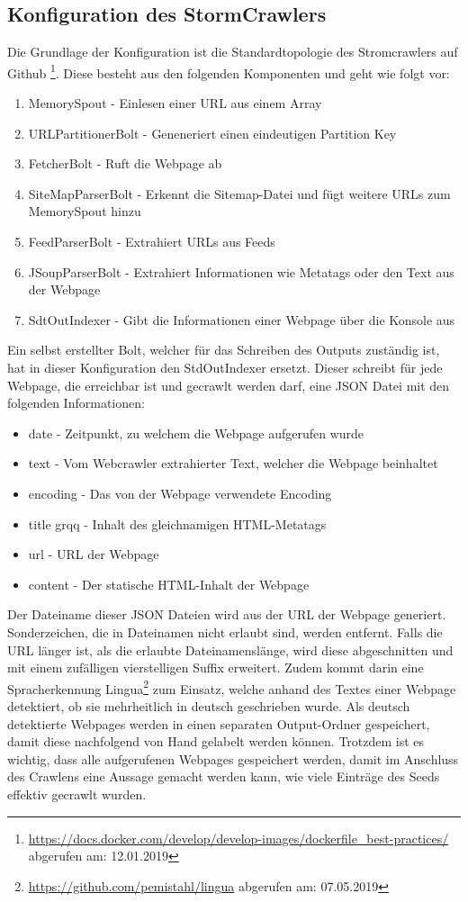 \subsection{Konfiguration des StormCrawlers}
Die Grundlage der Konfiguration ist die Standardtopologie des Stromcrawlers auf Github
\footnote{\url{https://docs.docker.com/develop/develop-images/dockerfile_best-practices/} abgerufen am: 12.01.2019}.
Diese besteht aus den folgenden Komponenten und geht wie folgt vor:
\begin{enumerate}
	\item MemorySpout - Einlesen einer URL aus einem Array
	\item URLPartitionerBolt - Geneneriert einen eindeutigen Partition Key
	\item FetcherBolt - Ruft die Webpage ab
	\item SiteMapParserBolt - Erkennt die Sitemap-Datei und fügt weitere URLs zum MemorySpout hinzu
	\item FeedParserBolt - Extrahiert URLs aus Feeds
	\item JSoupParserBolt - Extrahiert Informationen wie Metatags oder den Text aus der Webpage
	\item SdtOutIndexer - Gibt die Informationen einer Webpage über die Konsole aus
\end{enumerate}
Ein selbst erstellter Bolt, welcher für das Schreiben des Outputs zuständig ist, hat in dieser Konfiguration den StdOutIndexer ersetzt.
Dieser schreibt für jede Webpage, die erreichbar ist und gecrawlt werden darf, eine JSON Datei mit den folgenden Informationen:
\begin{itemize}
	\item \glqq date\grqq{} - Zeitpunkt, zu welchem die Webpage aufgerufen wurde
	\item \glqq text\grqq{} - Vom Webcrawler extrahierter Text, welcher die Webpage beinhaltet
	\item \glqq encoding\grqq{} - Das von der Webpage verwendete Encoding
	\item \glqq title grqq{} - Inhalt des gleichnamigen HTML-Metatags
	\item \glqq url\grqq{} - URL der Webpage
	\item \glqq content\grqq{} - Der statische HTML-Inhalt der Webpage	
\end{itemize}
Der Dateiname dieser JSON Dateien wird aus der URL der Webpage generiert. 
Sonderzeichen, die in Dateinamen nicht erlaubt sind, werden entfernt. Falls die URL länger ist, als die erlaubte Dateinamenslänge, wird diese abgeschnitten und mit einem zufälligen vierstelligen Suffix erweitert.
Zudem kommt darin eine Spracherkennung \glqq Lingua\footnote{\url{https://github.com/pemistahl/lingua} abgerufen am: 07.05.2019}\grqq{} zum Einsatz, welche anhand des Textes einer Webpage detektiert, ob sie mehrheitlich in deutsch geschrieben wurde.
Als deutsch detektierte Webpages werden in einen separaten Output-Ordner gespeichert, damit diese nachfolgend von Hand gelabelt werden können.
Trotzdem ist es wichtig, dass alle aufgerufenen Webpages gespeichert werden, damit im Anschluss des Crawlens eine Aussage gemacht werden kann, wie viele Einträge des Seeds effektiv gecrawlt wurden.
